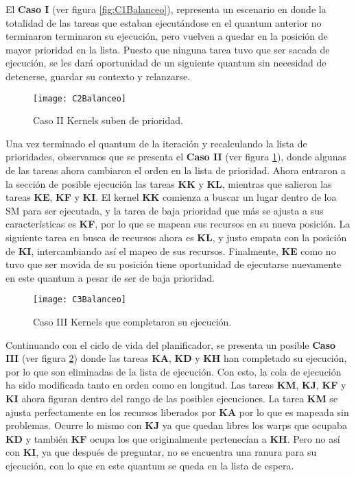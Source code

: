 El \textbf{Caso I} (ver figura \ref{fig:C1Balanceo}), representa un escenario en donde la totalidad de las tareas que estaban ejecutándose en el quantum anterior no terminaron terminaron su ejecución, pero vuelven a quedar en la posición de mayor prioridad en la lista. Puesto que ninguna tarea tuvo que ser sacada de ejecución, se les dará oportunidad de un siguiente quantum sin necesidad de detenerse, guardar su contexto y relanzarse.
\newline

    \begin{figure}[h!]
      \centering
        \texttt{[image: C2Balanceo]}
        \caption{Caso II Kernels suben de prioridad.}
        \label{fig:C2Balanceo}
    \end{figure}
    
Una vez terminado el quantum de la iteración y recalculando la lista de prioridades, observamos que se presenta el \textbf{Caso II} (ver figura \ref{fig:C2Balanceo}), donde algunas de las tareas ahora cambiaron el orden en la lista de prioridad. 
Ahora entraron a la sección de posible ejecución las tareas \textbf{KK} y \textbf{KL}, mientras que salieron las tareas \textbf{KE}, \textbf{KF} y \textbf{KI}. El kernel \textbf{KK} comienza a buscar un lugar dentro de loa SM para ser ejecutada, y la tarea de baja prioridad que más se ajusta a sus características es \textbf{KF}, por lo que se mapean sus recursos en su nueva posición. 
La siguiente tarea en busca de recursos ahora es \textbf{KL}, y justo empata con la posición de \textbf{KI}, intercambiando así el mapeo de sus recursos. Finalmente, \textbf{KE} como no tuvo que ser movida de su posición tiene oportunidad de ejecutarse nuevamente en este quantum a pesar de ser de baja prioridad.
\newline

    \begin{figure}[h!]
      \centering
        \texttt{[image: C3Balanceo]}
        \caption{Caso III Kernels que completaron su ejecución.}
        \label{fig:C3Balanceo}
    \end{figure}

Continuando con el ciclo de vida del planificador, se presenta un posible \textbf{Caso III} (ver figura \ref{fig:C3Balanceo}) donde las tareas \textbf{KA}, \textbf{KD} y \textbf{KH} han completado su ejecución, por lo que son eliminadas de la lista de ejecución. Con esto, la cola de ejecución ha sido modificada tanto en orden como en longitud. Las tareas \textbf{KM}, \textbf{KJ}, \textbf{KF} y \textbf{KI} ahora figuran dentro del rango de las posibles ejecuciones. 
La tarea \textbf{KM} se ajusta perfectamente en los recursos liberados por \textbf{KA} por lo que es mapeada sin problemas. Ocurre lo mismo con \textbf{KJ} ya que quedan libres los warps que ocupaba \textbf{KD} y también \textbf{KF} ocupa los que originalmente pertenecían a \textbf{KH}.
Pero no así con \textbf{KI}, ya que después de preguntar, no se encuentra una ranura para su ejecución, con lo que en este quantum se queda en la lista de espera.
\newline

